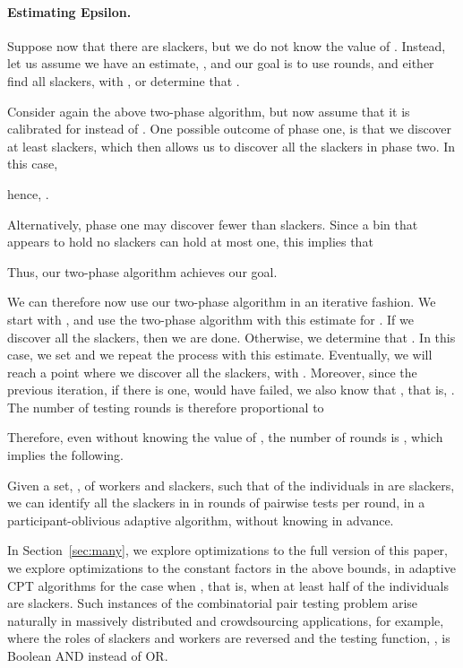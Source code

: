 \documentclass[11pt]{llncs}
\renewcommand{\subsection}[1]{\paragraph{\bf #1.}}
\begin{document}
\subsection{Estimating Epsilon}
Suppose now that there are
 slackers, but we do not know the value of .
Instead, let us assume we
have an estimate, , and our goal is to 
use  rounds,
and either find all  slackers, with
,
or determine that .

Consider again the above two-phase algorithm, but now 
assume that it is calibrated for  instead of .
One possible outcome of phase one, is that we discover
at least  slackers, which then allows us 
to discover all the slackers in phase two.
In this case,

hence,
.

Alternatively,
phase one may discover fewer than 
 slackers. 
Since a bin that appears to hold no slackers can hold at most one,
this implies that 

Thus, our two-phase algorithm achieves our goal.

We can therefore now use our two-phase algorithm 
in an iterative fashion. We start with , and use the two-phase
algorithm with this estimate for .
If we discover all the slackers, then we are done.
Otherwise, we determine that . 
In this case, we set
 and we repeat the process with this
estimate.
Eventually, we will reach a point where we discover all the slackers, with
.
Moreover, since the previous iteration, if there is one, would have 
failed, we also know that , that is, 
.
The number of testing rounds is therefore proportional to

Therefore, even without knowing the value of ,
the number of rounds is ,
which implies the following.

\begin{theorem}
Given a set, , of  workers and slackers, such that  of the
individuals in  are slackers, 
we can identify all the slackers in 
in  rounds of  pairwise tests
per round, in a participant-oblivious adaptive algorithm, 
without knowing  in advance.
\end{theorem}

In
\ifFull
Section~\ref{sec:many}, we explore optimizations to
\else
the full version of this paper, we explore optimizations to
\fi
the constant factors in
the above bounds, in adaptive CPT algorithms
for the case when , that is, when at least half
of the individuals are slackers.
Such instances of the combinatorial pair testing problem arise naturally
in massively distributed and crowdsourcing applications, for example,
where the roles of slackers and workers are reversed and the testing
function, , is Boolean AND instead of OR.
\end{document}
